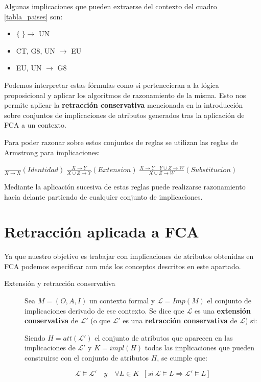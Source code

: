 	Algunas implicaciones que pueden extraerse del contexto del cuadro \ref{tabla_paises} son:
	
	\begin{itemize}
		\item $\{\;\} \rightarrow$ UN
		\item CT, G8, UN $\rightarrow$ EU
		\item EU, UN $\rightarrow$ G8 
	\end{itemize}

	 Podemos interpretar estas fórmulas como si pertenecieran a la lógica proposicional y aplicar los algoritmos de razonamiento de la misma. Esto nos permite aplicar la \textbf{retracción conservativa} mencionada en la introducción sobre conjuntos de implicaciones de atributos generados tras la aplicación de FCA a un contexto.
	 
	 Para poder razonar sobre estos conjuntos de reglas se utilizan las reglas de Armstrong para implicaciones: 
	 
	 $
	 	\frac{}{X \to X} (Identidad) \; \frac{X \to Y}{X \cup Z \to Y}(Extension) \; \frac{X \to Y \quad Y \cup Z \to W}{X \cup Z \to W}(Substitucion)
	 $
	
	Mediante la aplicación sucesiva de estas reglas puede realizarse razonamiento hacia delante partiendo de cualquier conjunto de implicaciones.
	
\section*{Retracción aplicada a FCA} 	

Ya que nuestro objetivo es trabajar con implicaciones de atributos obtenidas en FCA podemos especificar aun más los conceptos descritos en este apartado.

\begin{description}
	\item[Extensión y retracción conservativa] 
	Sea $M = (O,A,I)$ un contexto formal y $\mathcal{L} = Imp(M)$ el conjunto de implicaciones derivado de ese contexto. Se dice que $\mathcal{L}$ es una \textbf{extensión conservativa} de $\mathcal{L}'$ (o que $\mathcal{L}'$ es una \textbf{retracción conservativa} de $\mathcal{L}$) si:
	
	
	Siendo $H = att(\mathcal{L}')$ el conjunto de atributos que aparecen en las implicaciones de $\mathcal{L}'$ y $K = impl(H)$ todas las implicaciones que pueden construirse con el conjunto de atributos $H$, se cumple que: 
	
	
	\[ \mathcal{L} \models \mathcal{L}' \quad y \quad \forall L \in K \;\; [si \ \mathcal{L} \models L \Longrightarrow \mathcal{L}' \models L]  \]

\end{description}

